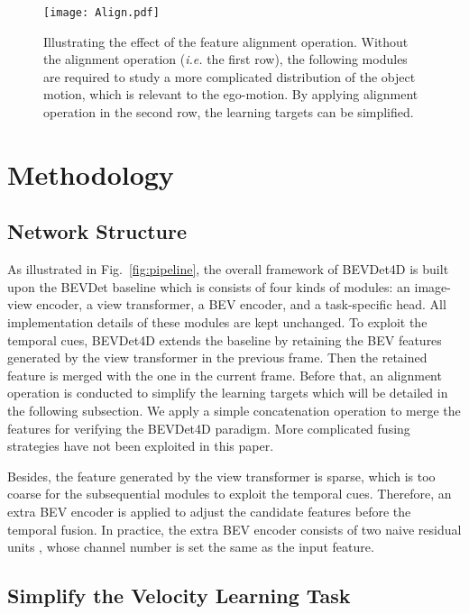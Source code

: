 \documentclass[10pt,twocolumn,letterpaper]{article}
\begin{document}
\begin{figure*}[t]
		\centering
		\texttt{[image: Align.pdf]}
		\caption{Illustrating the effect of the feature alignment operation. Without the alignment operation (\textit{i.e.} the first row), the following modules are required to study a more complicated distribution of the object motion, which is relevant to the ego-motion. By applying alignment operation in the second row, the learning targets can be simplified.}
		\label{fig:align}
\end{figure*}

\section{Methodology}

\subsection{Network Structure}
As illustrated in Fig.~\ref{fig:pipeline}, the overall framework of BEVDet4D is built upon the BEVDet \cite{BEVDet} baseline which is consists of four kinds of modules: an image-view encoder, a view transformer, a BEV encoder, and a task-specific head. All implementation details of these modules are kept unchanged. To exploit the temporal cues, BEVDet4D extends the baseline by retaining the BEV features generated by the view transformer in the previous frame. Then the retained feature is merged with the one in the current frame. Before that, an alignment operation is conducted to simplify the learning targets which will be detailed in the following subsection. We apply a simple concatenation operation to merge the features for verifying the BEVDet4D paradigm. More complicated fusing strategies have not been exploited in this paper.

Besides, the feature generated by the view transformer is sparse, which is too coarse for the subsequential modules to exploit the temporal cues. Therefore, an extra BEV encoder is applied to adjust the candidate features before the temporal fusion. In practice, the extra BEV encoder consists of two naive residual units \cite{ResNet}, whose channel number is set the same as the input feature.


\subsection{Simplify the Velocity Learning Task}
\end{document}
